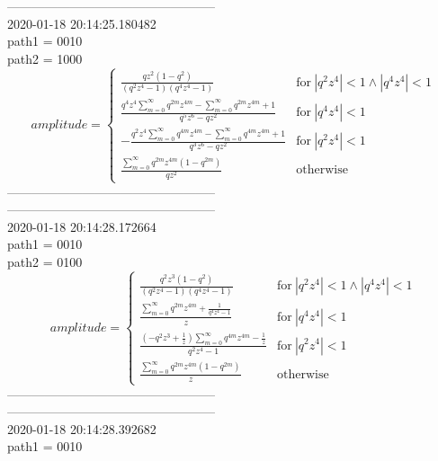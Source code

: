 --------------------------------------------------\\
2020-01-18 20:14:25.180482\\
path1 = 0010\\
path2 = 1000\\
$$amplitude = \begin{cases} \frac{q z^{2} \left(1 - q^{2}\right)}{\left(q^{2} z^{4} - 1\right) \left(q^{4} z^{4} - 1\right)} & \text{for}\: \left|{q^{2} z^{4}}\right| < 1 \wedge \left|{q^{4} z^{4}}\right| < 1 \\\frac{q^{4} z^{4} \sum_{m=0}^{\infty} q^{2 m} z^{4 m} - \sum_{m=0}^{\infty} q^{2 m} z^{4 m} + 1}{q^{5} z^{6} - q z^{2}} & \text{for}\: \left|{q^{4} z^{4}}\right| < 1 \\- \frac{q^{2} z^{4} \sum_{m=0}^{\infty} q^{4 m} z^{4 m} - \sum_{m=0}^{\infty} q^{4 m} z^{4 m} + 1}{q^{3} z^{6} - q z^{2}} & \text{for}\: \left|{q^{2} z^{4}}\right| < 1 \\\frac{\sum_{m=0}^{\infty} q^{2 m} z^{4 m} \left(1 - q^{2 m}\right)}{q z^{2}} & \text{otherwise} \end{cases}$$
--------------------------------------------------\\
--------------------------------------------------\\
2020-01-18 20:14:28.172664\\
path1 = 0010\\
path2 = 0100\\
$$amplitude = \begin{cases} \frac{q^{2} z^{3} \left(1 - q^{2}\right)}{\left(q^{2} z^{4} - 1\right) \left(q^{4} z^{4} - 1\right)} & \text{for}\: \left|{q^{2} z^{4}}\right| < 1 \wedge \left|{q^{4} z^{4}}\right| < 1 \\\frac{\sum_{m=0}^{\infty} q^{2 m} z^{4 m} + \frac{1}{q^{4} z^{4} - 1}}{z} & \text{for}\: \left|{q^{4} z^{4}}\right| < 1 \\\frac{\left(- q^{2} z^{3} + \frac{1}{z}\right) \sum_{m=0}^{\infty} q^{4 m} z^{4 m} - \frac{1}{z}}{q^{2} z^{4} - 1} & \text{for}\: \left|{q^{2} z^{4}}\right| < 1 \\\frac{\sum_{m=0}^{\infty} q^{2 m} z^{4 m} \left(1 - q^{2 m}\right)}{z} & \text{otherwise} \end{cases}$$
--------------------------------------------------\\
--------------------------------------------------\\
2020-01-18 20:14:28.392682\\
path1 = 0010\\
